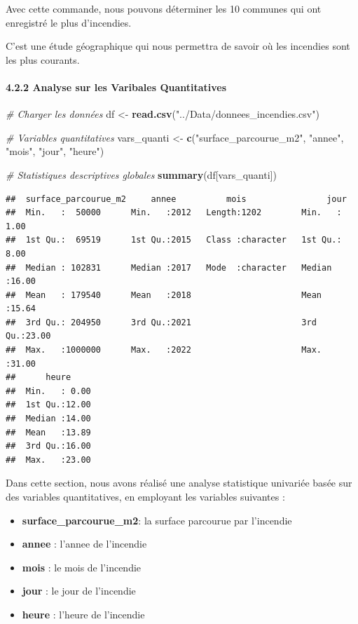 \documentclass[
]{article}
\newenvironment{Shaded}{\begin{snugshade}}{\end{snugshade}}
\newcommand{\CommentTok}[1]{\textcolor[rgb]{0.56,0.35,0.01}{\textit{#1}}}
\newcommand{\FunctionTok}[1]{\textcolor[rgb]{0.13,0.29,0.53}{\textbf{#1}}}
\newcommand{\NormalTok}[1]{#1}
\newcommand{\OtherTok}[1]{\textcolor[rgb]{0.56,0.35,0.01}{#1}}
\newcommand{\StringTok}[1]{\textcolor[rgb]{0.31,0.60,0.02}{#1}}
\providecommand{\tightlist}{%
  \setlength{\itemsep}{0pt}\setlength{\parskip}{0pt}}
\begin{document}
Avec cette commande, nous pouvons déterminer les 10 communes qui ont
enregistré le plus d'incendies.

C'est une étude géographique qui nous permettra de savoir où les
incendies sont les plus courants.

\paragraph{4.2.2 Analyse sur les Varibales
Quantitatives}\label{analyse-sur-les-varibales-quantitatives}

\begin{Shaded}
\begin{Highlighting}[]
\CommentTok{\# Charger les données}
\NormalTok{df }\OtherTok{\textless{}{-}} \FunctionTok{read.csv}\NormalTok{(}\StringTok{"../Data/donnees\_incendies.csv"}\NormalTok{)}

\CommentTok{\# Variables quantitatives}
\NormalTok{vars\_quanti }\OtherTok{\textless{}{-}} \FunctionTok{c}\NormalTok{(}\StringTok{"surface\_parcourue\_m2"}\NormalTok{, }\StringTok{"annee"}\NormalTok{, }\StringTok{"mois"}\NormalTok{, }\StringTok{"jour"}\NormalTok{, }\StringTok{"heure"}\NormalTok{)}

\CommentTok{\# Statistiques descriptives globales}
\FunctionTok{summary}\NormalTok{(df[vars\_quanti])}
\end{Highlighting}
\end{Shaded}

\begin{verbatim}
##  surface_parcourue_m2     annee          mois                jour      
##  Min.   :  50000      Min.   :2012   Length:1202        Min.   : 1.00  
##  1st Qu.:  69519      1st Qu.:2015   Class :character   1st Qu.: 8.00  
##  Median : 102831      Median :2017   Mode  :character   Median :16.00  
##  Mean   : 179540      Mean   :2018                      Mean   :15.64  
##  3rd Qu.: 204950      3rd Qu.:2021                      3rd Qu.:23.00  
##  Max.   :1000000      Max.   :2022                      Max.   :31.00  
##      heure      
##  Min.   : 0.00  
##  1st Qu.:12.00  
##  Median :14.00  
##  Mean   :13.89  
##  3rd Qu.:16.00  
##  Max.   :23.00
\end{verbatim}

Dans cette section, nous avons réalisé une analyse statistique univariée
basée sur des variables quantitatives, en employant les variables
suivantes :

\begin{itemize}
\tightlist
\item
  \textbf{surface\_parcourue\_m2}: la surface parcourue par l'incendie
\item
  \textbf{annee} : l'annee de l'incendie
\item
  \textbf{mois} : le mois de l'incendie
\item
  \textbf{jour} : le jour de l'incendie
\item
  \textbf{heure} : l'heure de l'incendie
\end{itemize}
\end{document}

